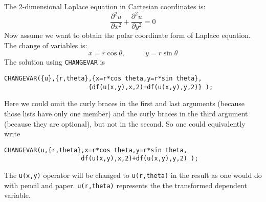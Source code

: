 The 2-dimensional Laplace equation in Cartesian coordinates is:
\[
   \frac{\partial^{2} u}{\partial x^{2}} +
   \frac{\partial^{2} u}{\partial y^{2}} = 0
\]
Now assume we want to obtain the polar coordinate form of Laplace equation.
The change of variables is:
\[
   x = r \cos \theta, {\;\;\;\;\;\;\;\;\;\;}  y = r \sin \theta
\]
The solution using {\tt CHANGEVAR} is
\begin{verbatim}
CHANGEVAR({u},{r,theta},{x=r*cos theta,y=r*sin theta},
                       {df(u(x,y),x,2)+df(u(x,y),y,2)} );
\end{verbatim}

Here we could omit the curly braces in the first and last arguments (because
those lists have only one member) and the curly braces in the third argument
(because they are optional), but not in the second.  So one could
equivalently write 
\begin{verbatim}
CHANGEVAR(u,{r,theta},x=r*cos theta,y=r*sin theta,
                     df(u(x,y),x,2)+df(u(x,y),y,2) );
\end{verbatim}

The {\tt u(x,y)} operator will be changed to {\tt u(r,theta)} in the
result as one would do with pencil and paper. {\tt u(r,theta)}
represents the  the transformed dependent variable.

